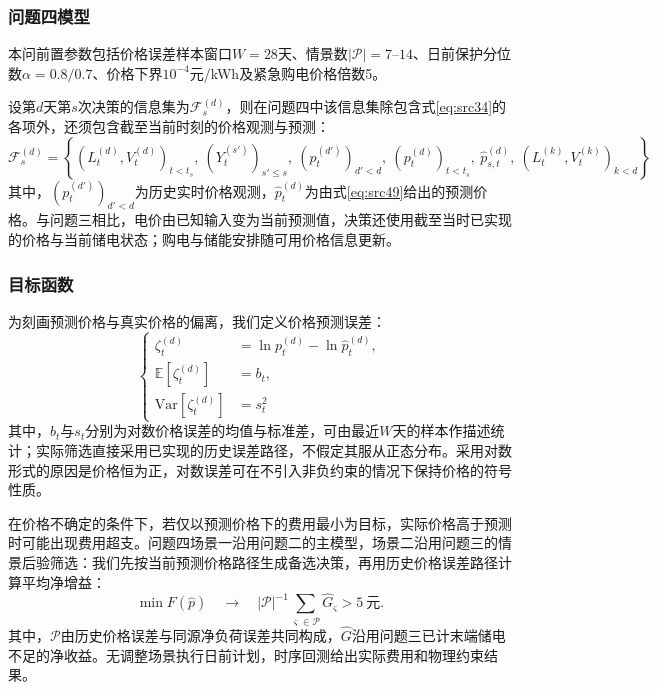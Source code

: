 \subsubsection{问题四模型}

本问前置参数包括价格误差样本窗口$W=28$天、情景数$|\mathcal P|=7$--$14$、日前保护分位数$\alpha=0.8/0.7$、价格下界$10^{-4}$元/kWh及紧急购电价格倍数5。


设第$d$天第$s$次决策的信息集为$\mathcal{F}_s^{(d)}$，则在问题四中该信息集除包含式\eqref{eq:src34}的各项外，还须包含截至当前时刻的价格观测与预测：
\begin{equation}\label{eq:src50}
    \mathcal{F}_{s}^{(d)}=\left\{\left(L_{t}^{(d)},V_{t}^{(d)}\right)_{t<t_{s}},\ \left(Y_{t}^{(s')}\right)_{s'\le s},\ \left(p_{t}^{(d')}\right)_{d'<d},\ \left(p_t^{(d)}\right)_{t<t_s},\ \hat{p}_{s,t}^{(d)},\ \left(L_{t}^{(k)},V_{t}^{(k)}\right)_{k<d}\right\}
\end{equation}
其中，$\left(p_t^{(d')}\right)_{d'<d}$为历史实时价格观测，$\hat{p}_t^{(d)}$为由式\eqref{eq:src49}给出的预测价格。与问题三相比，电价由已知输入变为当前预测值，决策还使用截至当时已实现的价格与当前储电状态；购电与储能安排随可用价格信息更新。

\subsubsection{目标函数}

为刻画预测价格与真实价格的偏离，我们定义价格预测误差：
\begin{equation}\label{eq:src51}
    \left\{\begin{aligned}
    \zeta_{t}^{(d)}&=\ln p_{t}^{(d)}-\ln\hat{p}_{t}^{(d)},\\[1mm]
    \mathbb{E}\left[\zeta_{t}^{(d)}\right]&=b_{t},\\[1mm]
    \mathrm{Var}\left[\zeta_{t}^{(d)}\right]&=s_{t}^{2}
    \end{aligned}\right.
\end{equation}
其中，$b_t$与$s_t$分别为对数价格误差的均值与标准差，可由最近$W$天的样本作描述统计；实际筛选直接采用已实现的历史误差路径，不假定其服从正态分布。采用对数形式的原因是价格恒为正，对数误差可在不引入非负约束的情况下保持价格的符号性质。

在价格不确定的条件下，若仅以预测价格下的费用最小为目标，实际价格高于预测时可能出现费用超支。问题四场景一沿用问题二的主模型，场景二沿用问题三的情景后验筛选：我们先按当前预测价格路径生成备选决策，再用历史价格误差路径计算平均净增益：
\begin{equation}\label{eq:src52}
 \min F(\hat p)\quad\longrightarrow\quad
 |\mathcal P|^{-1}\sum_{\varsigma\in\mathcal P}\hat G_{\varsigma}>5\ \text{元}.
\end{equation}
其中，$\mathcal P$由历史价格误差与同源净负荷误差共同构成，$\hat G$沿用问题三已计末端储电不足的净收益。无调整场景执行日前计划，时序回测给出实际费用和物理约束结果。


